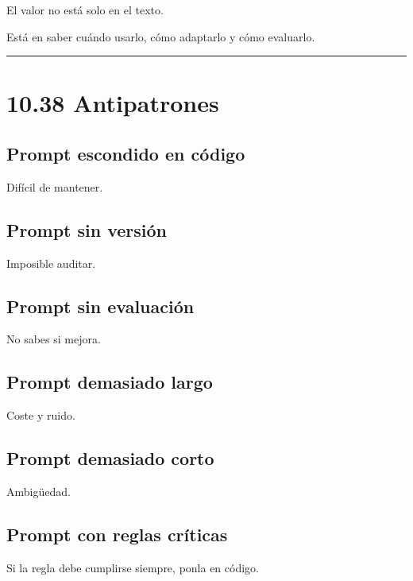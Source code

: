 El valor no está solo en el texto.

Está en saber cuándo usarlo, cómo adaptarlo y cómo evaluarlo.

\begin{center}\rule{0.5\linewidth}{0.5pt}\end{center}

\section{10.38 Antipatrones}\label{antipatrones}

\subsection{Prompt escondido en
código}\label{prompt-escondido-en-cuxf3digo}

Difícil de mantener.

\subsection{Prompt sin versión}\label{prompt-sin-versiuxf3n}

Imposible auditar.

\subsection{Prompt sin evaluación}\label{prompt-sin-evaluaciuxf3n}

No sabes si mejora.

\subsection{Prompt demasiado largo}\label{prompt-demasiado-largo}

Coste y ruido.

\subsection{Prompt demasiado corto}\label{prompt-demasiado-corto}

Ambigüedad.

\subsection{Prompt con reglas
críticas}\label{prompt-con-reglas-cruxedticas}

Si la regla debe cumplirse siempre, ponla en código.

